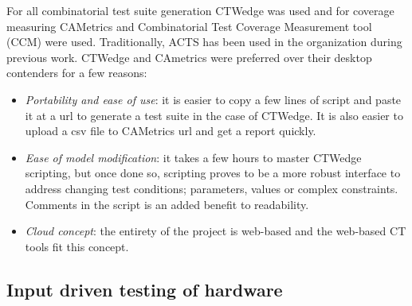 \documentclass[conference]{IEEEtran}
\begin{document}
	For all combinatorial test suite generation CTWedge \cite{gargantini2018migrating} was used and for coverage measuring CAMetrics \cite{leithner2018cametrics} and Combinatorial Test Coverage Measurement tool (CCM) \cite{kuhn2013combinatorial} were used.
	Traditionally, ACTS \cite{ACTS-tool} has been used in the organization during previous work.
	CTWedge and CAmetrics were preferred over their desktop contenders for a few reasons:

	\begin{itemize}
		\item \textit{Portability and ease of use}: it is easier to copy a few lines of script and paste it at a url to generate a test suite in the case of CTWedge. It is also easier to upload a csv file to CAMetrics url and get a report quickly.
		\item \textit{Ease of model modification}: it takes a few hours to master CTWedge scripting, but once done so, scripting proves to be a more robust interface to address changing test conditions; parameters, values or complex constraints. Comments in the script is an added benefit to readability. 
		\item \textit{Cloud concept}: the entirety of the project is web-based and the web-based CT tools fit this concept.
	\end{itemize}

	\subsection{Input driven testing of hardware} \label{Input driven testing of hardware}
\end{document}
